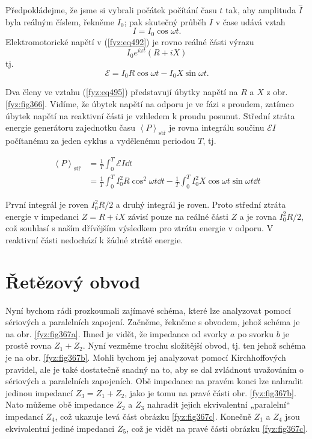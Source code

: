  Předpokládejme, že jsme si vybrali počátek počítání času \(t\) tak, aby amplituda \(\hat{I}\) 
  byla reálným číslem, řekněme \(I_0\); pak skutečný průběh \(I\) v čase udává vztah
  \begin{equation}\label{fyz:eq494}
  I = I_0\cos\omega t.
  \end{equation}
  Elektromotorické napětí v (\ref{fyz:eq492}) je rovno reálné části výrazu
  \begin{equation*}
    I_0e^{i\omega t}(R + iX)
  \end{equation*}
  tj.
  \begin{equation}\label{fyz:eq495}
    \mathscr{E} = I_0R\cos\omega t - I_0X\sin\omega t.
  \end{equation}
  
  Dva členy ve vztahu (\ref{fyz:eq495}) představují úbytky napětí na \(R\) a \(X\) z obr. 
  \ref{fyz:fig366}. Vidíme, že úbytek napětí na odporu je ve fázi s proudem, zatímco úbytek napětí 
  na reaktivní části je vzhledem k proudu posunut. Střední ztráta energie generátoru zajednotku 
  času \(\left\langle P\right\rangle_{\text{stř}}\) je rovna integrálu součinu \(\mathscr{E}I\) 
  počítanému za jeden cyklus a vydělenému periodou \(T\), tj.
  
  \begin{align*}
    \left\langle P\right\rangle_{\text{stř}} 
      &= \frac{1}{T}\int_0^T\mathscr{E}I\dd{t}             \\
      &= \frac{1}{T}\int_0^TI_0^2R\cos^2\omega t\dd{t}     
       - \frac{1}{T}\int_0^TI_0^2X\cos\omega t\sin\omega t\dd{t}
  \end{align*}
  
  První integrál je roven \(I_0^2R/2\) a druhý integrál je roven. Proto střední ztráta energie 
  v impedanci \(Z= R+iX\) závisí pouze na reálné části \(Z\) a je rovna \(I_0^2R/2\), což souhlasí 
  s naším dřívějším výsledkem pro ztrátu energie v odporu. V reaktivní části nedochází k žádné 
  ztrátě energie.
  
\section{Řetězový obvod}\label{fyz:IIchapXXIIsecVI}
  Nyní bychom rádi prozkoumali zajímavé schéma, které lze analyzovat pomocí sériových a paralelních 
  zapojení. Začněme, řekněme s obvodem, jehož schéma je na obr. \ref{fyz:fig367a}. Ihned je vidět, 
  že impedance od svorky \(a\) po svorku \(b\) je prostě rovna \(Z_1 + Z_2\). Nyní vezměme trochu 
  složitější obvod, tj. ten jehož schéma je na obr. \ref{fyz:fig367b}. Mohli bychom jej analyzovat 
  pomocí Kirchhoffových pravidel, ale je také dostatečně snadný na to, aby se dal zvládnout 
  uvažováním o sériových a paralelních zapojeních. Obě impedance na pravém konci lze nahradit 
  jedinou impedancí \(Z_3 = Z_1 + Z_2\), jako je tomu na pravé části obr. \ref{fyz:fig367b}. Nato 
  můžeme obě impedance \(Z_2\) a \(Z_3\) nahradit jejich ekvivalentní „paralelní“ impedancí 
  \(Z_4\), což ukazuje levá část obrázku \ref{fyz:fig367c}. Konečně \(Z_1\) a \(Z_4\) jsou 
  ekvivalentní jediné impedanci \(Z_5\), což je vidět na pravé části obrázku \ref{fyz:fig367c}.

